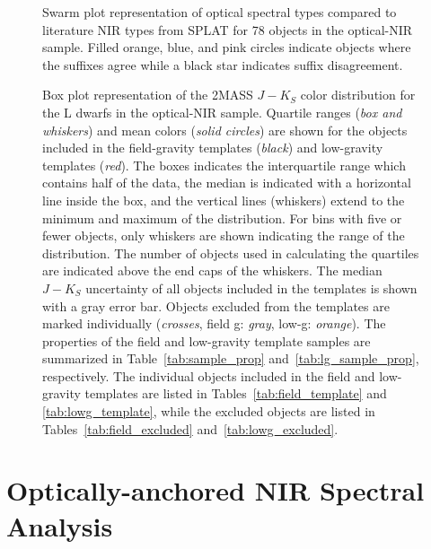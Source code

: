 \documentclass[modern,trackchanges]{aastex61}
\begin{document}
\begin{figure}
  \caption{Swarm plot representation of optical spectral types compared to literature NIR types from SPLAT for 78 objects in the optical-NIR sample.
  Filled orange, blue, and pink circles indicate objects where the suffixes agree while a black star indicates suffix disagreement.}
  \label{fig:opt_lit_nir_comparison}
\end{figure}

\begin{figure}
    \caption{Box plot representation of the 2MASS $J-K_S$ color distribution for the L dwarfs in the optical-NIR sample.
    Quartile ranges (\emph{box and whiskers}) and mean colors (\emph{solid circles}) are shown for the objects included in the field-gravity templates (\emph{black}) and low-gravity templates (\emph{red}).
    The boxes indicates the interquartile range which contains half of the data, the median is indicated with a horizontal line inside the box, and the vertical lines (whiskers) extend to the minimum and maximum of the distribution.
        For bins with five or fewer objects, only whiskers are shown indicating the range of the distribution.
        The number of objects used in calculating the quartiles are indicated above the end caps of the whiskers.
    The median $J-K_S$ uncertainty of all objects included in the templates is shown with a gray error bar.
    Objects excluded from the templates are marked individually (\emph{crosses}, field g: \emph{gray}, low-g: \emph{orange}).
    The properties of the field and low-gravity template samples are summarized in Table~\ref{tab:sample_prop} and~\ref{tab:lg_sample_prop}, respectively. The individual objects included in the field and low-gravity templates are listed in Tables~\ref{tab:field_template} and \ref{tab:lowg_template}, while the excluded objects are listed in Tables~\ref{tab:field_excluded} and~\ref{tab:lowg_excluded}.}
  \label{fig:JK_colors}
\end{figure}
\clearpage

\section{Optically-anchored NIR Spectral Analysis}
\end{document}
